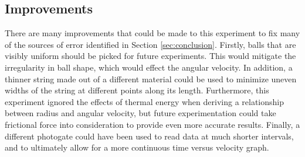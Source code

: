 \documentclass[10pt, letterpaper]{article}
\begin{document}
    \subsection{Improvements}

    There are many improvements that could be made to this experiment to fix many of the sources of error
    identified in Section \ref{sec:conclusion}. Firstly, balls that are visibly uniform should be picked
    for future experiments. This would mitigate the irregularity in ball shape, which would effect the angular
    velocity. In addition, a thinner string made out of a different material could be used to minimize
    uneven widths of the string at different points along its length. Furthermore, this experiment
    ignored the effects of thermal energy when deriving a relationship between radius and angular velocity,
    but future experimentation could take frictional force into consideration to provide even
    more accurate results. Finally, a different photogate could have been used to read data at
    much shorter intervals, and to ultimately allow for a more continuous time versus velocity graph.
\end{document}
